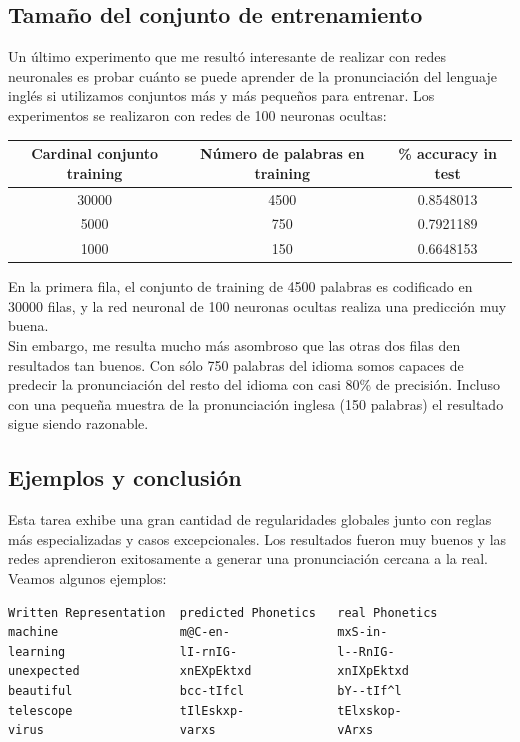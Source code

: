 \documentclass[paper=a4, fontsize=11pt]{scrartcl} %
\numberwithin{equation}{section} %
\numberwithin{figure}{section} %
\numberwithin{table}{section} %
\begin{document}
\subsection{Tamaño del conjunto de entrenamiento}
Un último experimento que me resultó interesante de realizar con redes neuronales es probar cuánto se puede aprender de la pronunciación del lenguaje inglés si utilizamos conjuntos más y más pequeños para entrenar. Los experimentos se realizaron con redes de 100 neuronas ocultas:


\begin{center}
\begin{tabular}{ |c|c|c|  }
\hline
Cardinal conjunto training & Número de palabras en training & \% accuracy in test \\
\hline 
30000 & 4500 & 0.8548013  \\
5000  & 750  & 0.7921189 \\
1000  & 150  & 0.6648153  \\
\hline
\end{tabular}
\end{center}

En la primera fila, el conjunto de training de 4500 palabras es codificado en 30000 filas, y la red neuronal de 100 neuronas ocultas realiza una predicción muy buena. \\

Sin embargo, me resulta mucho más asombroso que las otras dos filas den resultados tan buenos. Con sólo 750 palabras del idioma somos capaces de predecir la pronunciación del resto del idioma con casi 80\% de precisión. Incluso con una pequeña muestra de la pronunciación inglesa (150 palabras) el resultado sigue siendo razonable.\\


\subsection{Ejemplos y conclusión}

Esta tarea exhibe una gran cantidad de regularidades globales junto con reglas más especializadas y casos excepcionales. Los resultados fueron muy buenos y las redes aprendieron exitosamente a generar una pronunciación cercana a la real. Veamos algunos ejemplos:

\begin{center}
\begin{BVerbatim}
Written Representation  predicted Phonetics   real Phonetics  
machine                 m@C-en-               mxS-in-  
learning                lI-rnIG-              l--RnIG- 
unexpected              xnEXpEktxd            xnIXpEktxd  
beautiful               bcc-tIfcl             bY--tIf^l 
telescope               tIlEskxp-             tElxskop- 
virus                   varxs                 vArxs

\end{BVerbatim}
\end{center}
\end{document}
